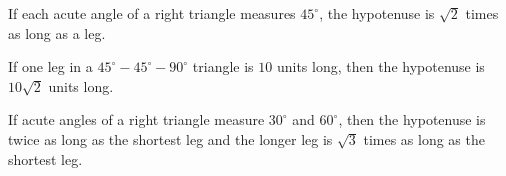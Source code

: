 \begin{theorem}
  If each acute angle of a right triangle measures $45^{\circ}$, the hypotenuse
  is $\sqrt{2}$ times as long as a leg.

  \begin{figure}[H]
    \centering


    \label{fig:45_45_90_triangle}
  \end{figure}
\end{theorem}

\begin{example}
  If one leg in a $45^{\circ}-45^{\circ}-90^{\circ}$ triangle is $10$ units
  long, then the hypotenuse is $10\sqrt{2}$ units long.
\end{example}

\begin{theorem}
  If acute angles of a right triangle measure $30^{\circ}$ and $60^{\circ}$,
  then the hypotenuse is twice as long as the shortest leg and the longer leg
  is $\sqrt{3}$ times as long as the shortest leg.

  \begin{figure}[H]
    \centering


    \label{fig:30_60_90_triangle}
  \end{figure}
\end{theorem}

